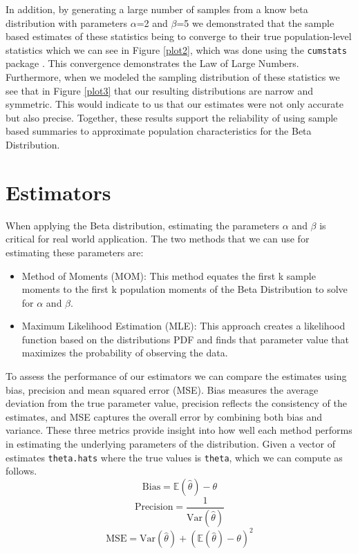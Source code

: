 \documentclass{article}\usepackage[]{graphicx}\usepackage[]{xcolor}
\begin{document}
\begin{multicols}{2}
In addition, by generating a large number of samples from a know beta distribution with parameters $\alpha$=2 and $\beta$=5 we demonstrated that the sample based estimates of these statistics being to converge to their true population-level statistics which we can see in Figure \ref{plot2}, which was done using the \texttt{cumstats} package \citep{cumstats}. This convergence demonstrates the Law of Large Numbers. Furthermore, when we modeled the sampling distribution of these statistics we see that in Figure \ref{plot3} that our resulting distributions are narrow and symmetric. This would indicate to us that our estimates were not only accurate but also precise. Together, these results support the reliability of using sample based summaries to approximate population characteristics for the Beta Distribution.


\section{Estimators}
When applying the Beta distribution, estimating the parameters $\alpha$ and $\beta$ is critical for real world application.
The two methods that we can use for estimating these parameters are:
\begin{itemize}
\item Method of Moments (MOM): This method equates the first k sample moments to the first k population moments of the Beta Distribution to solve for $\alpha$ and $\beta$.
\item Maximum Likelihood Estimation (MLE): This approach creates a likelihood function based on the distributions PDF and finds that parameter value that maximizes the probability of observing the data.
\end{itemize}


To assess the performance of our estimators we can compare the estimates using bias, precision and mean squared error (MSE). Bias measures the average deviation from the true parameter value, precision reflects the consistency of the estimates, and MSE captures the overall error by combining both bias and variance. These three metrics provide insight into how well each method performs in estimating the underlying parameters of the distribution. Given a vector of estimates \texttt{theta.hats} where the true values is \texttt{theta}, which we can compute as follows. 
\[
\text{Bias} = \mathbb{E}(\hat{\theta}) - \theta
\]
\[
\text{Precision} = \frac{1}{\text{Var}(\hat{\theta})}
\]
\[
\text{MSE} = \text{Var}(\hat{\theta}) + \left( \mathbb{E}(\hat{\theta}) - \theta \right)^2
\]



\end{multicols}
\end{document}
